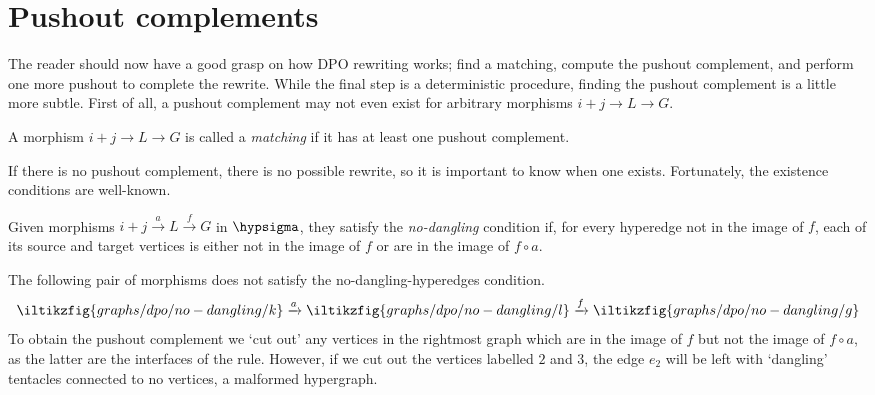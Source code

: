 \section{Pushout complements}

The reader should now have a good grasp on how DPO rewriting
works; find a matching, compute the pushout complement, and perform one more
pushout to complete the rewrite.
While the final step is a deterministic procedure, finding the pushout
complement is a little more subtle.
First of all, a pushout complement may not even exist for arbitrary morphisms
\(i+j \to L \to G\).

\begin{definition}
    A morphism \(i+j \to L \to G\) is called a \emph{matching} if it
    has at least one pushout complement.
\end{definition}

If there is no pushout complement, there is no possible rewrite, so it is
important to know when one exists.
Fortunately, the existence conditions are well-known.

\begin{definition}
    Given morphisms \(i+j \xrightarrow{a} L \xrightarrow{f} G\) in
    \(\hypsigma\), they satisfy the \emph{no-dangling} condition if, for every
    hyperedge not in
    the image of \(f\), each of its source and target vertices is either not in
    the image of \(f\) or are in the image of \(f \circ a\).
\end{definition}

\begin{example}
    The following pair of morphisms does not satisfy the no-dangling-hyperedges
    condition.
    \[
        \iltikzfig{graphs/dpo/no-dangling/k}
        \xrightarrow{a}
        \iltikzfig{graphs/dpo/no-dangling/l}
        \xrightarrow{f}
        \iltikzfig{graphs/dpo/no-dangling/g}
    \]
    To obtain the pushout complement we `cut out' any vertices in the
    rightmost graph which are in the image of \(f\) but not the image of
    \(f \circ a\), as the latter are the interfaces of the rule.
    However, if we cut out the vertices labelled \(2\) and \(3\), the edge
    \(e_2\) will be left with `dangling' tentacles connected to no vertices, a
    malformed hypergraph.
    \begin{center}
    \end{center}
\end{example}

